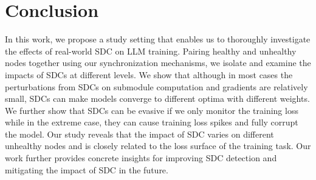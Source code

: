 \section{Conclusion}
In this work, we propose a study setting that enables us to thoroughly investigate the effects of real-world SDC on LLM training. Pairing healthy and unhealthy nodes together using our synchronization mechanisms, we isolate and examine the impacts of SDCs at different levels. 
We show that although in most cases the perturbations from SDCs on submodule computation and gradients are relatively small, SDCs can make models converge to different optima with different weights. We further show that SDCs can be evasive if we only monitor the training loss while in the extreme case, they can cause training loss spikes and fully corrupt the model. Our study reveals that the impact of SDC varies on different unhealthy nodes and is closely related to the loss surface of the training task.
Our work further provides concrete insights for improving SDC detection and mitigating the impact of SDC in the future.